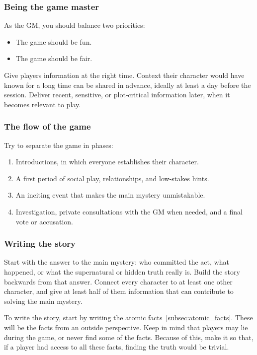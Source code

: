 \MMHostGuidanceHeading


\subsubsection{Being the game master}

As the GM, you should balance two priorities:
\begin{itemize}
  \item The game should be fun.
  \item The game should be fair.
\end{itemize}

Give players information at the right time. Context their character would have known for a long time can be shared in advance, ideally at least a day before the session. Deliver recent, sensitive, or plot-critical information later, when it becomes relevant to play.

\subsubsection{The flow of the game}

Try to separate the game in phases:
\begin{enumerate}
  \item Introductions, in which everyone establishes their character.
  \item A first period of social play, relationships, and low-stakes hints.
  \item An inciting event that makes the main mystery unmistakable.
  \item Investigation, private consultations with the GM when needed, and a final vote or accusation.
\end{enumerate}


\subsubsection{Writing the story}

Start with the answer to the main mystery: who committed the act, what happened, or what the supernatural or hidden truth really is. Build the story backwards from that answer. Connect every character to at least one other character, and give at least half of them information that can contribute to solving the main mystery.

To write the story, start by writing the atomic facts~\ref{subsec:atomic_facts}. These will be the facts from an outside perspective. Keep in mind that players may lie during the game, or never find some of the facts. Because of this, make it so that, if a player had access to all these facts, finding the truth would be trivial.

